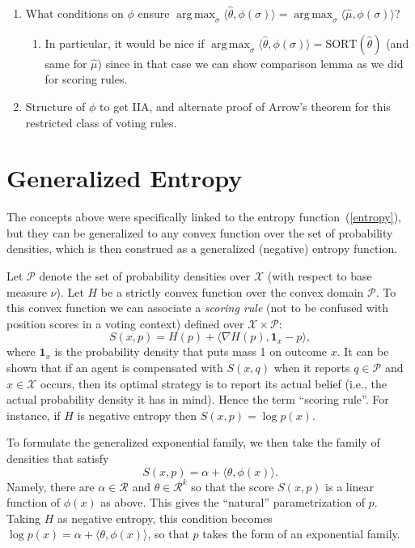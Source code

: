 \documentclass[10pt,letterpaper]{article}
\newcommand{\X}{\ensuremath{\mathcal{X}}}
\newcommand{\R}{\ensuremath{\mathcal{R}}}
\newcommand{\mP}{\ensuremath{\mathcal{P}}}
\newcommand{\ip}[2]{\ensuremath{\langle #1, #2 \rangle}}
\newcommand{\grad}{\nabla}
\newcommand{\one}{\ensuremath{\mathbf{1}}}
\newcommand{\sort}{\text{SORT}}
\newcommand{\muhat}{\hat{\mu}}
\newcommand{\that}{\hat{\theta}}
\DeclareMathOperator*{\argmax}{arg\,max}
\begin{document}
\begin{enumerate}
\item What conditions on $\phi$ ensure $\argmax_{\sigma} \langle \that, \phi(\sigma) \rangle = \argmax_{\sigma} \langle \muhat, \phi(\sigma) \rangle$? 
\begin{enumerate}
\item In particular, it would be nice if $\argmax_{\sigma} \langle \that, \phi(\sigma) \rangle = \sort(\that)$ (and same for $\muhat$) since in that case we can show comparison lemma as we did for scoring rules. 
\end{enumerate}

\item Structure of $\phi$ to get IIA, and alternate proof of Arrow's theorem for this restricted class of voting rules. 

\end{enumerate}


\pagebreak
\appendix

\section{Generalized Entropy}

The concepts above were specifically linked to the entropy function~(\ref{entropy}), but they can be generalized to any convex function over the set of probability densities, which is then construed as a generalized (negative) entropy function.

Let $\mP$ denote the set of probability densities over $\X$ (with respect to base measure $\nu$). Let $H$ be a strictly convex function over the convex domain $\mP$. To this convex function we can associate a \emph{scoring rule} (not to be confused with position scores in a voting context) defined over $\X \times \mP$:
%
\[
S(x, p) = H(p) + \ip{\grad H(p)}{\one_x - p},
\]
%
where $\one_x$ is the probability density that puts mass 1 on outcome $x$. It can be shown that if an agent is compensated with $S(x,q)$ when it reports $q \in \mP$ and $x \in \X$ occurs, then its optimal strategy is to report its actual belief (i.e., the actual probability density it has in mind). Hence the term ``scoring rule''. For instance, if $H$ is negative entropy then $S(x,p) = \log p(x)$.

To formulate the generalized exponential family, we then take the family of densities that satisfy
%
\begin{equation} \label{p-natural}
S(x,p) = \alpha + \ip{\theta}{\phi(x)}.
\end{equation}
%
Namely, there are $\alpha \in \R$ and $\theta \in \R^k$ so that the score $S(x,p)$ is a linear function of $\phi(x)$ as above. This gives the ``natural'' parametrization of $p$. Taking $H$ as negative entropy, this condition becomes $\log p(x) = \alpha + \ip{\theta}{\phi(x)}$, so that $p$ takes the form of an exponential family.
\end{document}
